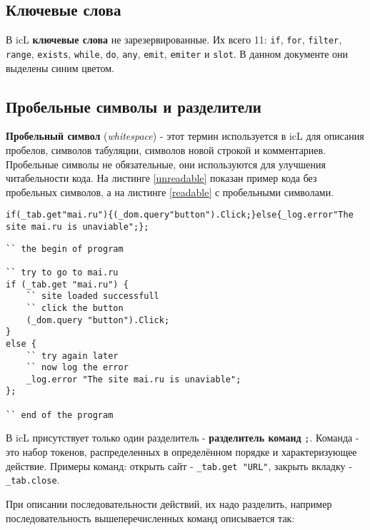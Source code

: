 \documentclass[a4paper, 14pt]{extarticle}
\begin{document}
\subsection{Ключевые слова}

В icL \textbf{ключевые слова} не зарезервированные. Их всего 11: \lstinline`if`, \lstinline`for`, \lstinline`filter`, \lstinline`range`, \lstinline`exists`, \lstinline`while`, \lstinline`do`, \lstinline`any`, \lstinline`emit`, \lstinline`emiter` и \lstinline`slot`. В данном документе они выделены синим цветом.

\subsection{Пробельные символы и разделители}

\textbf{Пробельный символ} (\textit{whitespace}) - этот термин используется в icL для описания пробелов, символов табуляции, символов новой строкой и комментариев. Пробельные символы не обязательные, они используются для улучшения читабельности кода. На листинге \ref{unreadable} показан пример кода без пробельных символов, а на листинге \ref{readable} с пробельными символами.

\begin{lstlisting}[caption=Koд без пробельных символов,label=unreadable]
if(_tab.get"mai.ru"){(_dom.query"button").Click;}else{_log.error"The site mai.ru is unaviable";};
\end{lstlisting}

\begin{lstlisting}[caption=Koд с пробельных символов,label=readable]
`` the begin of program

`` try to go to mai.ru
if (_tab.get "mai.ru") {
	`` site loaded successfull
	`` click the button
	(_dom.query "button").Click;
}
else {
	`` try again later
	`` now log the error
	_log.error "The site mai.ru is unaviable";
};

`` end of the program
\end{lstlisting}

В icL присутствует только один разделитель - \textbf{разделитель команд} \lstinline`;`. Команда - это набор токенов, распределенных в определённом порядке и характеризующее действие. Примеры команд: открыть сайт - \lstinline`_tab.get "URL"`, закрыть вкладку - \lstinline`_tab.close`.

При описании последовательности действий, их надо разделить, например последовательность вышеперечисленных команд описывается так:
\end{document}
